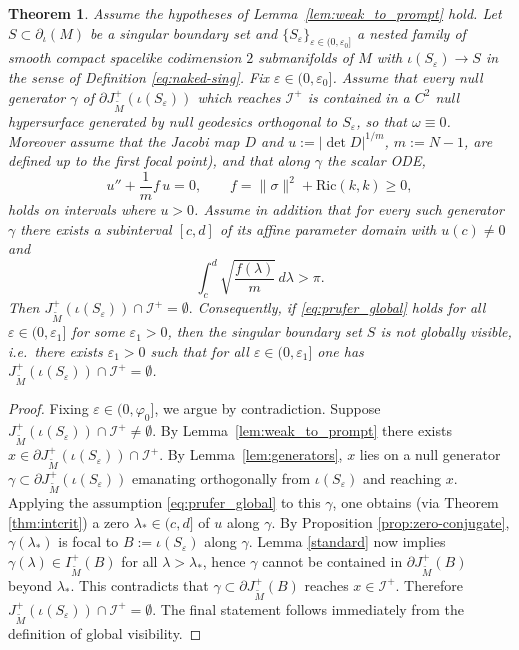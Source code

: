 \documentclass[a4paper, reqno]{amsart}
\numberwithin{equation}{section}
\theoremstyle{plain}
\newtheorem{theorem}{Theorem}[section]
\theoremstyle{definition}
\theoremstyle{remark}
\begin{document}
\begin{theorem}\label{thm:global_visibility_failure}
Assume the hypotheses of Lemma~\ref{lem:weak_to_prompt} hold. Let $S\subset\partial_\iota(M)$ be a singular boundary set and
$\{S_\varepsilon\}_{\varepsilon\in(0,\varepsilon_0]}$ a nested family of smooth compact spacelike codimension $2$ submanifolds of $M$ with $\iota(S_\varepsilon)\to S$ in the sense of Definition \ref{eq:naked-sing}. Fix $\varepsilon\in(0,\varepsilon_0]$. Assume that every null generator $\gamma$ of $\partial J^+_{\tilde M}(\iota(S_\varepsilon))$ which reaches $\mathscr I^+$ is contained
in a $C^2$ null hypersurface generated by null geodesics orthogonal to $S_\varepsilon$, so that $\omega\equiv0$.  Moreover assume that the Jacobi map $D$ and $u:=|\det D|^{1/m}$, $m:=N-1$, are defined up to the first focal point), and that along $\gamma$ the scalar ODE,
$$
u''+\frac{1}{m}f\,u=0,\qquad f=\|\sigma\|^2+\mathrm{Ric}(k,k)\ge0,
$$
holds on intervals where $u>0$.
Assume in addition that for every such generator $\gamma$ there exists a subinterval $[c,d]$ of its affine parameter domain with $u(c)\neq 0$ and
\begin{equation}\label{eq:prufer_global}
\int_c^d \sqrt{\frac{f(\lambda)}{m}}\,d\lambda>\pi.
\end{equation}
Then $J^+_{\tilde M}(\iota(S_\varepsilon))\cap\mathscr I^+=\emptyset.$ Consequently, if \eqref{eq:prufer_global} holds for all $\varepsilon\in(0,\varepsilon_1]$ for some $\varepsilon_1>0$, then the singular boundary set
$S$ is \emph{not globally visible}, i.e.\ there exists $\varepsilon_1>0$ such that for all
$\varepsilon\in(0,\varepsilon_1]$ one has $J^+_{\tilde M}(\iota(S_\varepsilon))\cap\mathscr I^+=\emptyset$.
\end{theorem}
\begin{proof}
Fixing $\varepsilon\in(0,\varphi_0]$, we argue by contradiction. Suppose $J^+_{\tilde M}(\iota(S_\varepsilon))\cap\mathscr I^+\neq\emptyset$. By
Lemma~\ref{lem:weak_to_prompt} there exists $x\in \partial J^+_{\tilde M}(\iota(S_\varepsilon))\cap\mathscr I^+.$ By Lemma~\ref{lem:generators}, $x$ lies on a null generator $\gamma\subset \partial J^+_{\tilde M}(\iota(S_\varepsilon))$
emanating orthogonally from $\iota(S_\varepsilon)$ and reaching $x$. Applying the assumption \eqref{eq:prufer_global} to this $\gamma$, one obtains (via Theorem \ref{thm:intcrit}) a zero $\lambda_* \in (c,d]$ of $u$ along $\gamma$. By Proposition \ref{prop:zero-conjugate}, $\gamma(\lambda_*)$ is focal to $B:=\iota(S_\varepsilon)$ along $\gamma$. Lemma \ref{standard} now implies $\gamma(\lambda)\in I^+_{\tilde M}(B)$ for all $\lambda>\lambda_*$, hence $\gamma$ cannot be contained in $\partial J^+_{\tilde M}(B)$ beyond $\lambda_*$. This contradicts that $\gamma\subset\partial J^+_{\tilde M}(B)$ reaches $x\in\mathscr I^+$. Therefore $J^+_{\tilde M}(\iota(S_\varepsilon))\cap\mathscr I^+=\emptyset$. The final statement follows immediately from the definition of global visibility.

\end{proof}
\end{document}
